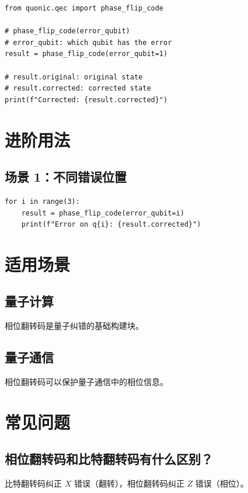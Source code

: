\documentclass[12pt,a4paper]{article}
\begin{document}
\begin{lstlisting}[style=python]
from quonic.qec import phase_flip_code

# phase_flip_code(error_qubit)
# error_qubit: which qubit has the error
result = phase_flip_code(error_qubit=1)

# result.original: original state
# result.corrected: corrected state
print(f"Corrected: {result.corrected}")
\end{lstlisting}

\section{进阶用法}

\subsection{场景 1：不同错误位置}

\begin{lstlisting}[style=python]
for i in range(3):
    result = phase_flip_code(error_qubit=i)
    print(f"Error on q{i}: {result.corrected}")
\end{lstlisting}

\section{适用场景}

\subsection{量子计算}

相位翻转码是量子纠错的基础构建块。

\subsection{量子通信}

相位翻转码可以保护量子通信中的相位信息。

\section{常见问题}

\subsection{相位翻转码和比特翻转码有什么区别？}

比特翻转码纠正 $X$ 错误（翻转），相位翻转码纠正 $Z$ 错误（相位）。
\end{document}
